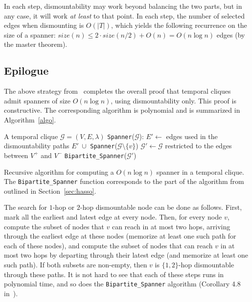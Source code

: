 \documentclass[USenglish, a4paper, thm-restate,numberwithinsect, cleveref]{lipics-v2021}
\newcommand{\G}{\ensuremath{\mathcal{G}}\xspace}
\begin{document}
In each step, dismountability may work beyond balancing the two parts, but in any case, it will work \emph{at least} to that point. In each step, the number of selected edges when dismounting is $O(|T|)$, which yields the following recurrence on the size of a spanner: $size(n) \le 2\cdot size(n/2) + O(n) = O(n\log n)$ edges (by the master theorem).

\subsection{Epilogue}

The above strategy from~\cite{Hasso} completes the overall proof that temporal cliques admit spanners of size $O(n \log n)$, using dismountability only. This proof is constructive. The corresponding algorithm is polynomial and is summarized in Algorithm~\ref{algo}.

\begin{algorithm}
  \begin{algorithmic}
    \Require A temporal clique $\G=(V,E,\lambda)$\smallskip
    \State \hspace*{-10pt}\texttt{Spanner}($\G$):
    \State $E' \gets $ edges used in the dismountability paths 
    \State \Return $E'~\cup$ \texttt{Spanner}($\G \setminus \{v\}$)
    \Else
    \State $\G' \gets \G$ restricted to the edges between $V^+$ and $V^-$
    \State \Return \texttt{Bipartite\_Spanner}($\G'$) 
    \EndIf
\end{algorithmic}
\caption{\label{algo}Recursive algorithm for computing a $O(n \log n)$ spanner in a temporal clique. The \texttt{Bipartite\_Spanner} function corresponds to the part of the algorithm from~\cite{Hasso} outlined in Section~\ref{sec:hasso}.}
\end{algorithm}

The search for $1$-hop or $2$-hop dismountable node can be done as follows. First, mark all the earliest and latest edge at every node. Then, for every node $v$, compute the subset of nodes that $v$ can reach in at most two hops, arriving through the earliest edge at these nodes (memorize at least one such path for each of these nodes), and compute the subset of nodes that can reach $v$ in at most two hops by departing through their latest edge (and memorize at least one such path). If both subsets are non-empty, then $v$ is $\{1,2\}$-hop dismountable through these paths. It is not hard to see that each of these steps runs in polynomial time, and so does the \texttt{Bipartite\_Spanner} algorithm (Corollary 4.8 in~\cite{Hasso}).
\end{document}
